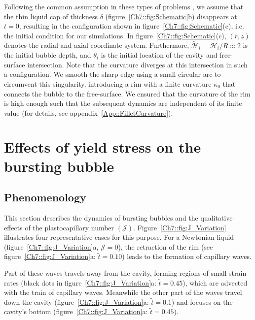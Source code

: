 Following the common assumption in these types of problems \citep{deike2018dynamics, gordillo2019capillary}, we assume that the thin liquid cap of thickness $\delta$ (figure~\ref{Ch7::fig:Schematic}b) disappears at $t = 0$, resulting in the configuration shown in figure~\ref{Ch7::fig:Schematic}(c), i.e. the initial condition for our simulations. In figure~\ref{Ch7::fig:Schematic}(c), $\left(r, z\right)$ denotes the radial and axial coordinate system. Furthermore, $\tilde{\mathcal{H}}_i = \mathcal{H}_i/R \approx 2$ is the initial bubble depth, and $\theta_i$ is the initial location of the cavity and free-surface intersection. Note that the curvature diverges at this intersection in such a configuration. We smooth the sharp edge using a small circular arc to circumvent this singularity, introducing a rim with a finite curvature $\kappa_0$ that connects the bubble to the free-surface. We ensured that the curvature of the rim is high enough such that the subsequent dynamics are independent of its finite value (for details, see appendix~\ref{App::FilletCurvature}).

\section{Effects of yield stress on the bursting bubble}\label{Sec::Phenomenological}

\subsection{Phenomenology}\label{Sec::Phenomenological1}

This section describes the dynamics of bursting bubbles and the qualitative effects of the plastocapillary number $\left(\mathcal{J}\right)$. Figure~\ref{Ch7::fig:J_Variation} illustrates four representative cases for this purpose. For a Newtonian liquid (figure~\ref{Ch7::fig:J_Variation}a, $\mathcal{J} = 0$), the retraction of the rim (see figure~\ref{Ch7::fig:J_Variation}a: $\tilde{t} = 0.10$) leads to the formation of capillary waves. 

Part of these waves travels away from the cavity, forming regions of small strain rates (black dots in figure~\ref{Ch7::fig:J_Variation}a: $\tilde t = 0.45$), which are advected with the train of capillary waves. 
Meanwhile the other part of the waves travel down the cavity (figure~\ref{Ch7::fig:J_Variation}a: $\tilde  t = 0.1$) and focuses on the cavity's bottom (figure~\ref{Ch7::fig:J_Variation}a: $\tilde  t = 0.45$). 

